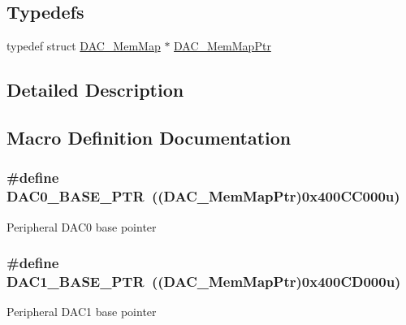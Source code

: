 \subsection*{Typedefs}
\begin{DoxyCompactItemize}
\item 
typedef struct \hyperlink{struct_d_a_c___mem_map}{D\+A\+C\+\_\+\+Mem\+Map} $\ast$ \hyperlink{group___d_a_c___peripheral_gaf4fffbe25ce148c577ec740897223a7f}{D\+A\+C\+\_\+\+Mem\+Map\+Ptr}
\end{DoxyCompactItemize}


\subsection{Detailed Description}


\subsection{Macro Definition Documentation}
\hypertarget{group___d_a_c___peripheral_gabe3b30df06ec04e5c899efd6e49f1800}{}
\subsubsection[{D\+A\+C0\+\_\+\+B\+A\+S\+E\+\_\+\+P\+T\+R}]{\setlength{\rightskip}{0pt plus 5cm}\#define D\+A\+C0\+\_\+\+B\+A\+S\+E\+\_\+\+P\+T\+R~(({\bf D\+A\+C\+\_\+\+Mem\+Map\+Ptr})0x400\+C\+C000u)}\label{group___d_a_c___peripheral_gabe3b30df06ec04e5c899efd6e49f1800}
Peripheral D\+A\+C0 base pointer \hypertarget{group___d_a_c___peripheral_gab3af24d21edf756c3f794c52b5789847}{}
\subsubsection[{D\+A\+C1\+\_\+\+B\+A\+S\+E\+\_\+\+P\+T\+R}]{\setlength{\rightskip}{0pt plus 5cm}\#define D\+A\+C1\+\_\+\+B\+A\+S\+E\+\_\+\+P\+T\+R~(({\bf D\+A\+C\+\_\+\+Mem\+Map\+Ptr})0x400\+C\+D000u)}\label{group___d_a_c___peripheral_gab3af24d21edf756c3f794c52b5789847}
Peripheral D\+A\+C1 base pointer \hypertarget{group___d_a_c___peripheral_gab47690040e4d63adc4f324358c27157a}{}
